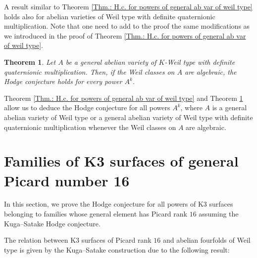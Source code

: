 \documentclass[11pt,twoside,a4paper]{amsart}
\newcommand{\0}{\mathscr{O}}
\theoremstyle{plain}
\newtheorem{thm}{Theorem}[section]
\theoremstyle{definition}
\theoremstyle{remark}
\begin{document}
A result similar to Theorem \ref{Thm.: H.c. for powers of general ab var of weil type} holds also for abelian varieties of Weil type with definite quaternionic multiplication. Note that one need to add to the proof the same modifications as we introduced in the proof of Theorem \ref{Thm.: H.c. for powers of general ab var of weil type}.

\begin{thm}\cite[Thm.\ 4.1]{abdulali1999abelianIII}
\label{Thm.: Hodge conjecture abelian variety of Weil type with definite quaternionic multiplication}
Let $A$ be a general abelian variety of $K$-Weil type with definite quaternionic multiplication. Then, if the Weil classes on $A$ are algebraic, the Hodge conjecture holds for every power $A^k$.
\end{thm}

Theorem \ref{Thm.: H.c. for powers of general ab var of weil type} and Theorem \ref{Thm.: Hodge conjecture abelian variety of Weil type with definite quaternionic multiplication} allow us to deduce the Hodge conjecture for all powers $A^k$, where $A$ is a general abelian variety of Weil type or a general abelian variety of Weil type with definite quaternionic multiplication whenever the Weil classes on $A$ are algebraic.

\section{Families of K3 surfaces of general Picard number 16}
\label{Sec. Families of K3 of Pic 16}
In this section, we prove the Hodge conjecture for all powers of K3 surfaces belonging to families whose general element has Picard rank $16$ assuming the Kuga--Satake Hodge conjecture.

\smallskip

The relation between K3 surfaces of Picard rank $16$ and abelian fourfolds of Weil type is given by the Kuga--Satake construction due to the following result:
\end{document}
